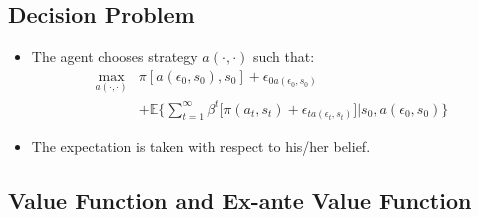 \documentclass[
]{book}
\providecommand{\tightlist}{%
  \setlength{\itemsep}{0pt}\setlength{\parskip}{0pt}}
\begin{document}
\hypertarget{decision-problem}{%
\subsection{Decision Problem}\label{decision-problem}}

\begin{itemize}
\tightlist
\item
  The agent chooses strategy \(a(\cdot, \cdot)\) such that:
  \begin{equation}
  \begin{split}
  \max_{a(\cdot, \cdot)} & \pi[a(\epsilon_0, s_0), s_0] + \epsilon_{0 a(\epsilon_0, s_0)}\\
  &+ \mathbb{E}\Bigg\{ \sum_{t = 1}^\infty \beta^t \Bigg[\pi(a_t, s_t) + \epsilon_{t a(\epsilon_t, s_t)}\Bigg]\Bigg|s_0, a(\epsilon_0, s_0)\Bigg\}
  \end{split}
  \end{equation}
\item
  The expectation is taken with respect to his/her belief.
\end{itemize}

\hypertarget{value-function-and-ex-ante-value-function}{%
\subsection{Value Function and Ex-ante Value Function}\label{value-function-and-ex-ante-value-function}}
\end{document}
